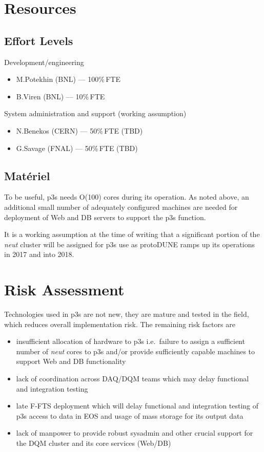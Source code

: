 \documentclass[pdftex,12pt,letter]{article}
\newcommand{\pd}{protoDUNE\xspace}
\begin{document}
\section{Resources}

\subsection{Effort Levels}

Development/engineering
\begin{itemize}
\item M.Potekhin (BNL) --- 100\%\,FTE
\item B.Viren (BNL) --- 10\%\,FTE
\end{itemize}

\noindent System administration and support (working assumption)

\begin{itemize}
\item N.Benekos (CERN) --- 50\%\,FTE (TBD)
\item G.Savage (FNAL) --- 50\%\,FTE (TBD)
\end{itemize}

\subsection{Mat\'eriel}
To be useful, p3s needs O(100) cores during its operation. As noted above,
an additional small number of adequately configured machines are needed for
deployment of Web and DB servers to support the p3s function.

It is a working assumption at the time of writing that a significant portion of
the \textit{neut} cluster \cite{neut} will be assigned for p3s use as \pd ramps up
its operations in 2017 and into 2018.


\section{Risk Assessment}

Technologies used in p3s are not new, they are mature and tested in the field, which reduces
overall implementation risk. The remaining risk factors are
\begin{itemize}

\item insufficient allocation of hardware to p3s i.e.~failure to assign a sufficient number
of \textit{neut} cores to p3s and/or provide sufficiently capable machines to support Web
and DB functionality

\item lack of coordination across DAQ/DQM teams which may delay functional and integration
testing

\item late F-FTS deployment which will delay functional and integration testing of p3s access
to data in EOS and usage of mass storage for its output data

\item lack of manpower to provide robust sysadmin and other crucial support for the DQM
cluster and its core services (Web/DB)

\end{itemize}
\end{document}
